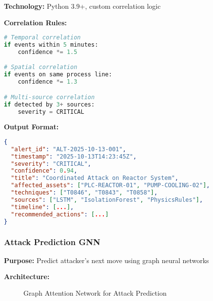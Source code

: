 \documentclass[12pt,a4paper]{article}
\begin{document}
\textbf{Technology:} Python 3.9+, custom correlation logic

\textbf{Correlation Rules:}
\begin{lstlisting}[language=python]
# Temporal correlation
if events within 5 minutes:
    confidence *= 1.5

# Spatial correlation  
if events on same process line:
    confidence *= 1.3

# Multi-source correlation
if detected by 3+ sources:
    severity = CRITICAL
\end{lstlisting}

\textbf{Output Format:}
\begin{lstlisting}[language=json]
{
  "alert_id": "ALT-2025-10-13-001",
  "timestamp": "2025-10-13T14:23:45Z",
  "severity": "CRITICAL",
  "confidence": 0.94,
  "title": "Coordinated Attack on Reactor System",
  "affected_assets": ["PLC-REACTOR-01", "PUMP-COOLING-02"],
  "techniques": ["T0846", "T0843", "T0858"],
  "sources": ["LSTM", "IsolationForest", "PhysicsRules"],
  "timeline": [...],
  "recommended_actions": [...]
}
\end{lstlisting}

\subsubsection{Attack Prediction GNN}

\textbf{Purpose:} Predict attacker's next move using graph neural networks

\textbf{Architecture:}

\begin{figure}[H]
\centering
{}
\caption{Graph Attention Network for Attack Prediction}
\end{figure}
\end{document}
